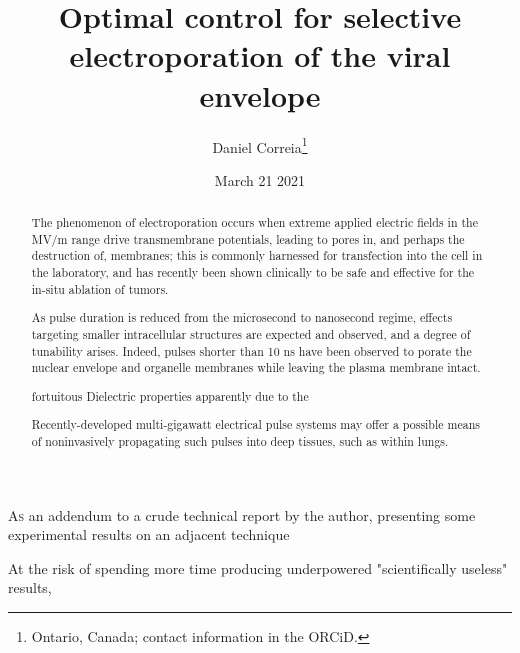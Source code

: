 \documentclass[fleqn,10pt]{paper}
\begin{document}
\title{Optimal control for selective electroporation of the viral envelope}
\author{\footnotesize{Daniel Correia}\footnote{Ontario, Canada; contact information in the ORCiD.}}
\date{\small{March 21 2021}}

\flushbottom 
\maketitle



\thispagestyle{empty}

\renewcommand{\abstractname}{Summary}    %

\begin{abstract}
	\noindent The phenomenon of electroporation occurs when extreme applied electric fields in the MV/m range drive transmembrane potentials, leading to pores in, and perhaps the destruction of, membranes; this is commonly harnessed for transfection into the cell in the laboratory, and has recently been shown clinically to be safe and effective for the in-situ ablation of tumors.
	
	\noindent As pulse duration is reduced from the microsecond to nanosecond regime, effects targeting smaller intracellular structures are expected and observed, and a degree of tunability arises. Indeed, pulses shorter than 10 ns have been observed to porate the nuclear envelope and organelle membranes while leaving the plasma membrane intact.
	
	fortuitous Dielectric properties apparently due to the 
	
	\noindent Recently-developed multi-gigawatt electrical pulse systems may offer a possible means of noninvasively propagating such pulses into deep tissues, such as within lungs. 
\end{abstract}




\lettrine{A}{s} an addendum to a crude technical report \cite{notes2021} by the author, presenting some experimental results on an adjacent technique

At the risk of spending more time producing underpowered "scientifically useless" results, 
\end{document}
